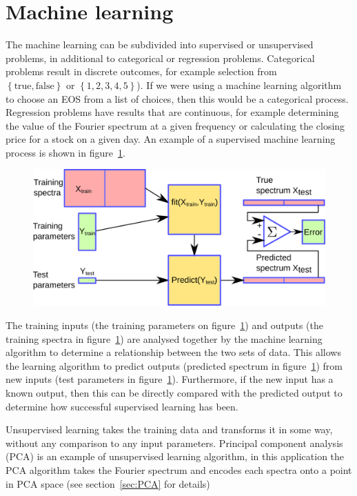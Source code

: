 \section{Machine learning}
The machine learning can be subdivided into supervised or unsupervised problems, in additional to categorical or regression problems. Categorical problems result in discrete outcomes, for example selection from $\left\lbrace \text{true}, \text{false} \right\rbrace\text{ or }\left\lbrace 1,2,3,4,5\right\rbrace$). If we were using a machine learning algorithm to choose an EOS from a list of choices, then this would be a categorical process. Regression problems have results that are continuous, for example determining the value of the Fourier spectrum at a given frequency or calculating the closing price for a stock on a given day. An example of a supervised machine learning process is shown in figure~\ref{fig:MLvariables2}. 

\begin{figure}[H]
	\centering
	\includegraphics[width=15cm]{./img/MLvariables2.png} 
	\caption[\protect]{\protect}%
	\label{fig:MLvariables2}
\end{figure}
The training inputs (the training parameters on figure~\ref{fig:MLvariables2}) and outputs (the training spectra in figure~\ref{fig:MLvariables2}) are analysed together by the machine learning algorithm to determine a relationship between the two sets of data. This allows the learning algorithm to predict outputs (predicted spectrum in figure~\ref{fig:MLvariables2}) from new inputs (test parameters in figure~\ref{fig:MLvariables2}). Furthermore, if the new input has a known output, then this can be directly compared with the predicted output to determine how successful supervised learning has been. \par
Unsupervised learning takes the training data and transforms it in some way, without any comparison to any input parameters. Principal component analysis (PCA) is an example of unsupervised learning algorithm, in this application the PCA algorithm takes the Fourier spectrum and encodes each spectra onto a point in PCA space (see section~\ref{sec:PCA} for details)



